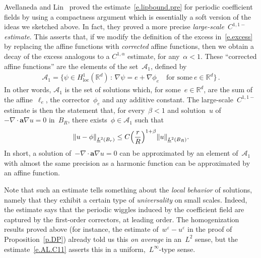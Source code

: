 \documentclass[11pt]{article} %
\numberwithin{equation}{section}
\theoremstyle{definition}
\let\originalleft\left
\let\originalright\right
\renewcommand{\left}{\mathopen{}\mathclose\bgroup\originalleft}
\renewcommand{\right}{\aftergroup\egroup\originalright}
\newcommand*{\Rd}{\ensuremath{\mathbb{R}^d}}
\newcommand{\eps}{\varepsilon}
\newcommand{\ep}{\eps}
\renewcommand{\a}{\mathbf{a}}
\begin{document}
Avellaneda and Lin~\cite{AL1} proved the estimate~\eqref{e.lipbound.pre} for periodic coefficient fields by using a compactness argument which is essentially a soft version of the ideas we sketched above. In fact, they proved a more precise \emph{large-scale~$C^{1,1-}$ estimate}. This asserts that, if we modify the definition of the excess in~\eqref{e.excess} by replacing the affine functions with \emph{corrected} affine functions, then we obtain a decay of the excess analogous to a $C^{1,\alpha}$ estimate, for any~$\alpha<1$. 
These ``corrected affine functions'' are the elements of the set~$\mathcal{A}_1$, defined by
\begin{align*}  
\mathcal{A}_1 = \bigl\{ \psi \in H^1_{\mathrm{loc}}(\Rd) \, : \, \nabla \psi = e + \nabla \phi_e \quad \mbox{for some} \ e \in \Rd \bigr\} \,.
\end{align*}
In other words, $\mathcal{A}_1$ is the set of solutions which, for some~$e\in\Rd$, are the sum of the affine~$\ell_e$, the corrector~$\phi_e$ and any additive constant. The large-scale~$C^{1,1-}$ estimate is then the statement that, for every~$\beta<1$ and solution~$u$ of~$-\nabla \cdot \a\nabla u = 0$ in~$B_R$, there exists~$\phi \in \mathcal{A}_1$ such that 
\begin{equation}
\label{e.AL.C11}
\left\| u - \phi \right\|_{\underline{L}^2(B_r)} 
\leq 
C \left( \frac r R \right)^{1+\beta} 
\left\| u  \right\|_{\underline{L}^2(B_R)}.
\end{equation}
In short, a solution of~$-\nabla \cdot \a\nabla u=0$ can be approximated by an element of~$\mathcal{A}_1$ with almost the same precision as a harmonic function can be approximated by an affine function. 

\smallskip

Note that such an estimate tells something about  the \emph{local behavior} of solutions, 
namely that they exhibit a certain type of \emph{universality} on small scales.
Indeed, the estimate says that the periodic wiggles induced by the coefficient field are captured by the first-order correctors, at leading order. The homogenization results proved above (for instance, the estimate of~$w^\ep - u^\ep$ in the proof of Proposition~\ref{p.DP}) already told us this \emph{on average} in an~$L^2$ sense, but the estimate~\eqref{e.AL.C11} asserts this in a uniform,~$L^\infty$-type sense. 

\smallskip
\end{document}
